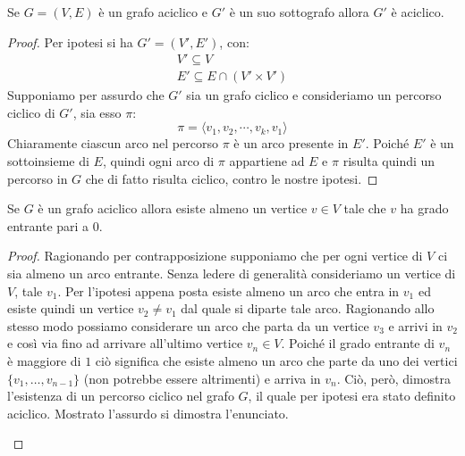 \begin{propbox}
		Se $G=(V,E)$ è un grafo aciclico e $G'$ è un suo sottografo allora $G'$ è aciclico.
\end{propbox}

\begin{proof}
	Per ipotesi si ha $G' = (V',E') $, con:
\begin{displaymath}
\begin{array}{c}
			V' \subseteq V \\
			E' \subseteq E \cap (V' \times V')
\end{array}
\end{displaymath}
Supponiamo per assurdo che $G'$ sia un grafo ciclico e consideriamo un percorso ciclico di $G'$, sia esso $\pi$:
\begin{displaymath}
	\pi = \langle v_{1}, v_{2}, \cdots, v_{k}, v_{1}\rangle
\end{displaymath}
Chiaramente ciascun arco nel percorso $\pi$ è un arco presente in $E'$. Poiché $E'$ è un sottoinsieme di $E$, quindi ogni arco di $\pi$ appartiene ad $E$ e $\pi$ risulta quindi un percorso in $G$ che di fatto risulta ciclico, contro le nostre ipotesi.
\end{proof}

\begin{propbox}
	Se $G$ è un grafo aciclico allora esiste almeno un vertice $v \in V$ tale che $v$ ha grado entrante pari a $0$.
\end{propbox}


\begin{proof}
	Ragionando per contrapposizione supponiamo che per ogni vertice di $V$ ci sia almeno un arco entrante. Senza ledere di generalità consideriamo un vertice di $V$, tale $v_{1}$. Per l'ipotesi appena posta esiste almeno un arco che entra in $v_{1}$ ed esiste quindi un vertice $v_{2} \neq v_{1}$ dal quale si diparte tale arco. Ragionando allo stesso modo possiamo considerare un arco che parta da un vertice $v_{3}$ e arrivi in $v_{2}$ e così via fino ad arrivare all'ultimo vertice $v_{n} \in V$.  Poiché il grado entrante di $v_{n}$ è maggiore di $1$ ciò significa che esiste almeno un arco che parte da uno dei vertici $\{v_{1},\ldots, v_{n-1}\}$ (non potrebbe essere altrimenti) e arriva in $v_{n}$. Ciò, però, dimostra l'esistenza di un percorso ciclico nel grafo $G$, il quale per ipotesi era stato definito aciclico. Mostrato l'assurdo si dimostra l'enunciato.
\begin{center}
\end{center}
\end{proof}



